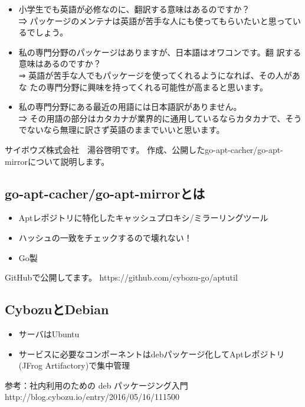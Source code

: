 \documentclass[mingoth,a4paper]{jsarticle}
\begin{document}
  \begin{itemize}
  \item 小学生でも英語が必修なのに、翻訳する意味はあるのですか？\\

    ⇒ パッケージのメンテナは英語が苦手な人にも使ってもらいたいと思っているでしょう。

   \item 私の専門分野のパッケージはありますが、日本語はオワコンです。翻
	 訳する意味はあるのですか？\\

	 ⇒ 英語が苦手な人でもパッケージを使ってくれるようになれば、その人があな
	 たの専門分野に興味を持ってくれる可能性が高まると思います。

   \item 私の専門分野にある最近の用語には日本語訳がありません。\\

	 ⇒ その用語の部分はカタカナが業界的に通用しているならカタカナで、そうでないなら無理に訳さず英語のままでいいと思います。
  \end{itemize}


サイボウズ株式会社　湯谷啓明です。
作成、公開したgo-apt-cacher/go-apt-mirrorについて説明します。

\subsection{go-apt-cacher/go-apt-mirrorとは}

\begin{itemize}
 \item Aptレポジトリに特化したキャッシュプロキシ/ミラーリングツール
 \item ハッシュの一致をチェックするので壊れない！
 \item Go製
\end{itemize}

GitHubで公開してます。
https://github.com/cybozu-go/aptutil

\subsection{CybozuとDebian}
\begin{itemize}
 \item サーバはUbuntu
 \item サービスに必要なコンポーネントはdebパッケージ化してAptレポジトリ(JFrog Artifactory)で集中管理
\end{itemize}
参考：社内利用のための deb パッケージング入門http://blog.cybozu.io/entry/2016/05/16/111500
\end{document}
